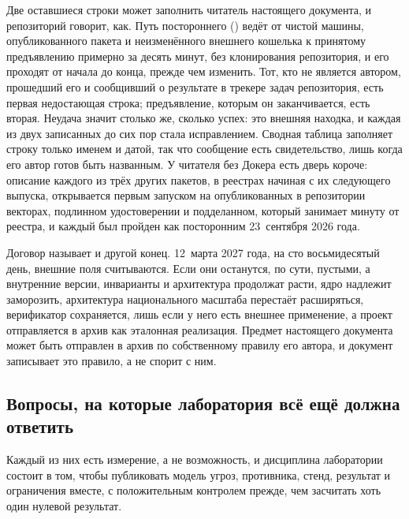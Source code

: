 Две оставшиеся строки может заполнить читатель настоящего документа, и репозиторий говорит, как. Путь
постороннего () ведёт от чистой машины, опубликованного пакета и
неизменённого внешнего кошелька к принятому предъявлению примерно за десять минут, без клонирования
репозитория, и его проходят от начала до конца, прежде чем изменить. Тот, кто не является автором,
прошедший его и сообщивший о результате в трекере задач репозитория, есть первая недостающая строка;
предъявление, которым он заканчивается, есть вторая. Неудача значит столько же, сколько успех: это
внешняя находка, и каждая из двух записанных до сих пор стала исправлением. Сводная таблица заполняет
строку только именем и датой, так что сообщение есть свидетельство, лишь когда его автор готов быть
названным. У читателя без Докера есть дверь короче: описание каждого из трёх других пакетов, в реестрах начиная с их следующего выпуска,
открывается первым запуском на опубликованных в репозитории векторах, подлинном удостоверении и
подделанном, который занимает минуту от реестра, и каждый был пройден как посторонним
23~сентября 2026 года. \sExt

Договор называет и другой конец. 12~марта 2027 года, на сто восьмидесятый день, внешние поля
считываются. Если они останутся, по сути, пустыми, а внутренние версии, инварианты и архитектура
продолжат расти, ядро надлежит заморозить, архитектура национального масштаба перестаёт
расширяться, верификатор сохраняется, лишь если у него есть внешнее применение, а проект
отправляется в архив как эталонная реализация. Предмет настоящего документа может быть отправлен в
архив по собственному правилу его автора, и документ записывает это правило, а не спорит с ним.
\sExt

\subsection{Вопросы, на которые лаборатория всё ещё должна ответить}

Каждый из них есть измерение, а не возможность, и дисциплина лаборатории состоит в том, чтобы
публиковать модель угроз, противника, стенд, результат и ограничения вместе, с положительным
контролем прежде, чем засчитать хоть один нулевой результат.

